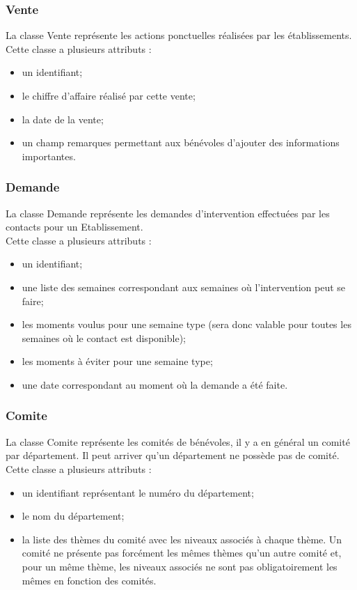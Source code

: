 \subsubsection*{Vente}
La classe Vente représente les actions ponctuelles réalisées par les établissements.\\ 
Cette classe a plusieurs attributs : 
\begin{itemize}
\item un identifiant; 
\item le chiffre d'affaire réalisé par cette vente;
\item la date de la vente;
\item un champ remarques permettant aux bénévoles d'ajouter des informations importantes. 
\end{itemize}

\subsubsection*{Demande}

La classe Demande représente les demandes d'intervention effectuées par les contacts pour un Etablissement.\\
Cette classe a plusieurs attributs :
\begin{itemize}
\item un identifiant;
\item une liste des semaines correspondant aux semaines où l'intervention peut se faire; 
\item les moments voulus pour une semaine type (sera donc valable pour toutes les semaines où le contact est disponible);
\item les moments à éviter pour une semaine type;
\item une date correspondant au moment où la demande a été faite.
\end{itemize}

\subsubsection*{Comite}

La classe Comite représente les comités de bénévoles, il y a en général un comité par département. Il peut arriver qu'un département ne possède pas de comité.\\
Cette classe a plusieurs attributs :
\begin{itemize}
\item un identifiant représentant le numéro du département;
\item le nom du département;
\item la liste des thèmes du comité avec les niveaux associés à chaque thème. Un comité ne présente pas forcément les mêmes thèmes qu'un autre comité et, pour un même thème, les niveaux associés ne sont pas obligatoirement les mêmes en fonction des comités. 
\end{itemize}

